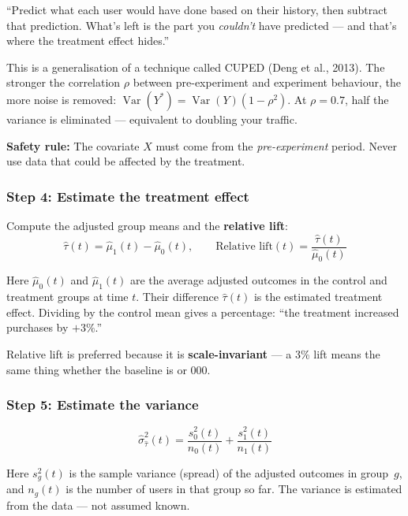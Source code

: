 \documentclass[12pt, a4paper]{article}
\newcommand{\Var}{\operatorname{Var}}
\begin{document}
\begin{plainlanguage}
``Predict what each user would have done based on their history, then subtract
that prediction.  What's left is the part you \emph{couldn't} have predicted
--- and that's where the treatment effect hides.''

This is a generalisation of a technique called CUPED (Deng et al., 2013).
The stronger the correlation $\rho$ between pre-experiment and experiment
behaviour, the more noise is removed:
$\Var(Y^*) = \Var(Y)(1 - \rho^2)$.
At $\rho = 0.7$, half the variance is eliminated ---
equivalent to doubling your traffic.
\end{plainlanguage}

\textbf{Safety rule:} The covariate $X$ must come from the
\emph{pre-experiment} period.  Never use data that could be affected by
the treatment.

\subsubsection*{Step 4: Estimate the treatment effect}

Compute the adjusted group means and the \textbf{relative lift}:
\[
  \hat{\tau}(t) = \hat{\mu}_1(t) - \hat{\mu}_0(t), \qquad
  \text{Relative lift}(t) = \frac{\hat{\tau}(t)}{\hat{\mu}_0(t)}
\]

\begin{plainlanguage}
Here $\hat{\mu}_0(t)$ and $\hat{\mu}_1(t)$ are the average adjusted outcomes
in the control and treatment groups at time $t$.  Their difference
$\hat{\tau}(t)$ is the estimated treatment effect.  Dividing by the control
mean gives a percentage: ``the treatment increased purchases by $+3\%$.''

Relative lift is preferred because it is \textbf{scale-invariant} --- a 3\%
lift means the same thing whether the baseline is  or
000.
\end{plainlanguage}

\subsubsection*{Step 5: Estimate the variance}

\[
  \hat{\sigma}_{\hat{\tau}}^2(t)
  = \frac{s_0^2(t)}{n_0(t)} + \frac{s_1^2(t)}{n_1(t)}
\]

\begin{plainlanguage}
Here $s_g^2(t)$ is the sample variance (spread) of the adjusted outcomes in
group~$g$, and $n_g(t)$ is the number of users in that group so far.
The variance is estimated from the data --- not assumed known.
\end{plainlanguage}
\end{document}
